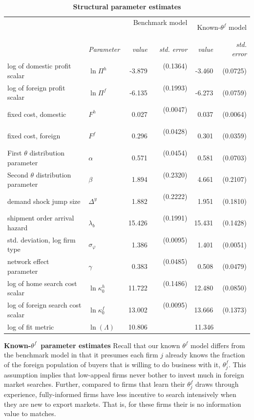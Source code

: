 \documentclass[12pt]{article}
\begin{document}
\begin{table}[tbp]
\caption{\textbf{Structural parameter estimates}}
\label{tab:struct_param}\centering
{\small \ }
\par
{\small 
\begin{tabular}{llrrrr}
\hline\hline
&  & \multicolumn{2}{r}{Benchmark model \ \ \ } & \multicolumn{2}{r}{Known-$%
\theta ^{f}$ model} \\ 
& \textit{Parameter} & \textit{value} & \textit{std. error} & \textit{value}
& \textit{std. error} \\ \cline{2-3}\cline{2-6}
log of domestic profit scalar & $\ln \Pi ^{h}$ & -3.879 & (0.1364) \ \  & 
-3.460 & (0.0725) \\ 
log of foreign profit scalar & $\ln \Pi ^{f}$ & -6.135 & (0.1993) \ \  & 
-6.273 & (0.0759) \\ 
fixed cost, domestic & $F^{h}$ & 0.027 & (0.0047) \ \  & 0.037 & (0.0064) \\ 
fixed cost, foreign & $F^{f}$ & 0.296 & (0.0428) \ \  & 0.301 & (0.0359) \\ 
First $\theta $ distribution parameter & $\alpha $ & 0.571 & (0.0454) \ \  & 
0.581 & (0.0703) \\ 
Second $\theta $ distribution parameter & $\beta $ & 1.894 & (0.2320) \ \  & 
4.661 & (0.2107) \\ 
demand shock jump size & $\Delta ^{y}$ & 1.882 & (0.2222) \ \  & 1.951 & 
(0.1810) \\ 
shipment order arrival hazard & $\lambda _{b}$ & 15.426 & (0.1991) \ \  & 
15.431 & (0.1428) \\ 
std. deviation, log firm type & $\sigma _{\varphi }$ & 1.386 & (0.0095) \ \ 
& 1.401 & (0.0051) \\ 
network effect parameter & $\gamma $ & 0.383 & (0.0485) \ \  & 0.508 & 
(0.0479) \\ 
log of home search cost scalar & $\ln \kappa _{0}^{h}$ & 11.722 & (0.1486) \
\  & 12.480 & (0.0850) \\ 
log of foreign search cost scalar & $\ln \kappa _{0}^{f}$ & 13.002 & 
(0.0095) \ \  & 13.666 & (0.1373) \\ \cline{3-6}
log of fit metric & $\ln (\Lambda )$ & \multicolumn{2}{r}{10.806 \ \ \ \ \ \
\ \ \ \ \ } & \multicolumn{2}{r}{11.346 \ \ \ \ \ \ \ \ \ } \\ \hline
\end{tabular}
}
\end{table}

\textbf{Known-}$\theta ^{f}$\textbf{\ parameter estimates }Recall that our
known $\theta ^{f}$ model differs from the benchmark model in that it
presumes each firm $j$ already knows the fraction of the foreign population
of buyers that is willing to do business with it, $\theta _{j}^{f}.$ This
assumption implies that low-appeal firms never bother to invest much in
foreign market searches. Further, compared to firms that learn their $\theta
_{j}^{f}$ draws through experience, fully-informed firms have less incentive
to search intensively when they are new to export markets. That is, for
these firms their is no information value to matches.
\end{document}
